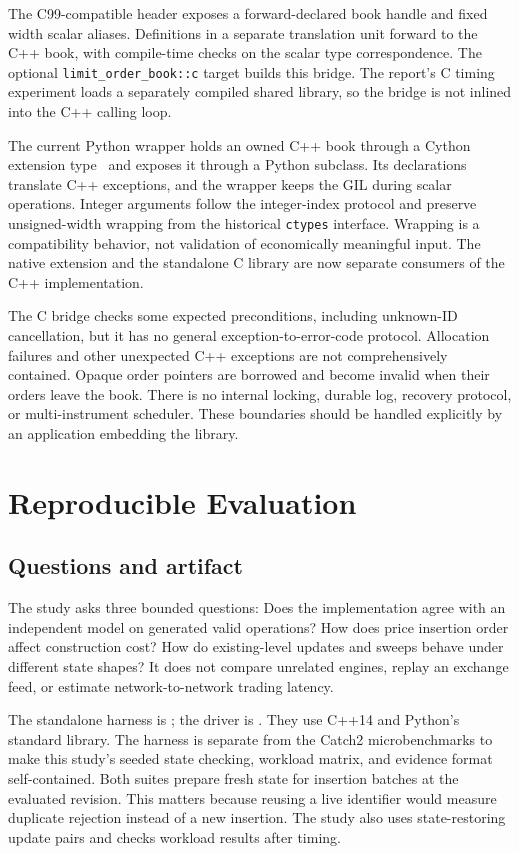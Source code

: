 \documentclass[10pt,letterpaper,twocolumn]{article}
\newcommand{\code}[1]{\texttt{#1}}
\begin{document}
The C99-compatible header exposes a forward-declared book handle and fixed
width scalar aliases. Definitions in a separate translation unit forward to
the C++ book, with compile-time checks on the scalar type correspondence.
The optional \code{limit\_order\_book::c} target builds this bridge. The report's
C timing experiment loads a separately compiled shared library, so the bridge
is not inlined into the C++ calling loop.

The current Python wrapper holds an owned C++ book through a Cython extension
type~\cite{cython} and exposes it through a Python subclass. Its declarations translate C++
exceptions, and the wrapper keeps the GIL during scalar operations. Integer
arguments follow the integer-index protocol and preserve unsigned-width
wrapping from the historical \code{ctypes} interface. Wrapping is a
compatibility behavior, not validation of economically meaningful input.
The native extension and the standalone C library are now separate consumers
of the C++ implementation.

The C bridge checks some expected preconditions, including unknown-ID
cancellation, but it has no general exception-to-error-code protocol. Allocation
failures and other unexpected C++ exceptions are not comprehensively contained.
Opaque order pointers are borrowed and become invalid when their orders leave
the book. There is no internal locking, durable log, recovery protocol, or
multi-instrument scheduler. These boundaries should be handled explicitly by
an application embedding the library.

\section{Reproducible Evaluation}
\subsection{Questions and artifact}
The study asks three bounded questions: Does the implementation agree with
an independent model on generated valid operations? How does price insertion
order affect construction cost? How do existing-level updates and sweeps
behave under different state shapes? It does not compare unrelated engines,
replay an exchange feed, or estimate network-to-network trading latency.

The standalone harness is ; the driver is
. They use C++14 and Python's standard library.
The harness is separate from the Catch2 microbenchmarks to make this study's
seeded state checking, workload matrix, and evidence format self-contained.
Both suites prepare fresh state for insertion batches at the evaluated
revision. This matters because reusing a live identifier would measure
duplicate rejection instead of a new insertion. The study also uses
state-restoring update pairs and checks workload results after timing.
\end{document}
